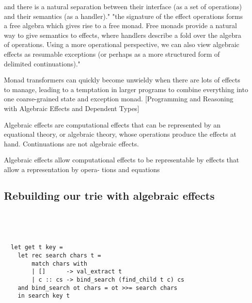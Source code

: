 \cite{kammar2013handlers}



and there is a natural separation between
their interface (as a set of operations)
and
their semantics (as a handler)."
"the signature of the effect operations forms a free algebra which gives rise to a free monad.
Free monads provide a natural way to give semantics to effects,
where handlers describe a fold over the algebra of operations.
Using a more operational perspective,
we can also view algebraic effects as resumable exceptions
(or perhaps as a more structured form of delimited continuations)."
\cite{leijen2017type}

Monad transformers can quickly become unwieldy when there are lots of effects to manage,
leading to a temptation in larger programs to combine everything into one coarse-grained state and exception monad.
[Programming and Reasoning with Algebraic Effects and Dependent Types]

Algebraic effects are computational effects that can be represented by an equational theory, or algebraic theory, whose operations produce the effects at hand.
Continuations are not algebraic effects.

Algebraic effects allow computational effects to be representable by
effects that allow a representation by opera- tions and equations

\subsection{Rebuilding our trie with algebraic effects}
\begin{verbatim}




  let get t key =
    let rec search chars t =
        match chars with
        | []      -> val_extract t
        | c :: cs -> bind_search (find_child t c) cs
    and bind_search ot chars = ot >>= search chars
    in search key t



\end{verbatim}



